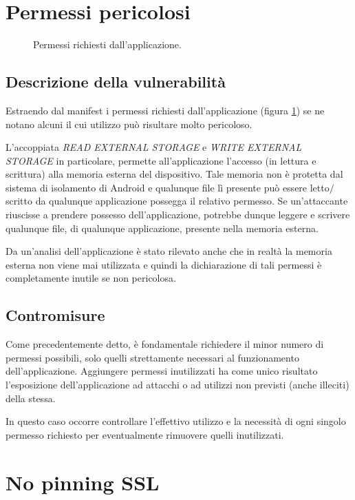 \section{Permessi pericolosi}

\begin{figure}[h]
	\centering 
	\caption{Permessi richiesti dall'applicazione.}
	\label{fig:permessi}
\end{figure}

\subsection{Descrizione della vulnerabilità}

Estraendo dal manifest i permessi richiesti dall'applicazione (figura \ref{fig:permessi}) se ne notano alcuni il cui utilizzo può risultare molto pericoloso. 

L'accoppiata \emph{READ EXTERNAL STORAGE} e \emph{WRITE EXTERNAL STORAGE} in particolare, permette all'applicazione l'accesso (in lettura e scrittura) alla memoria esterna del dispositivo. Tale memoria non è protetta dal sistema di isolamento di Android e qualunque file lì presente può essere letto$/$scritto da qualunque applicazione possegga il relativo permesso. Se un'attaccante riuscisse a prendere possesso dell'applicazione, potrebbe dunque leggere e scrivere qualunque file, di qualunque applicazione, presente nella memoria esterna.

Da un'analisi dell'applicazione è stato rilevato anche che in realtà la memoria esterna non viene mai utilizzata e quindi la dichiarazione di tali permessi è completamente inutile se non pericolosa.

\subsection{Contromisure}
Come precedentemente detto, è fondamentale richiedere il minor numero di permessi possibili, solo quelli strettamente necessari al funzionamento dell'applicazione. Aggiungere permessi inutilizzati ha come unico risultato l'esposizione dell'applicazione ad attacchi o ad utilizzi non previsti (anche illeciti) della stessa.

In questo caso occorre controllare l'effettivo utilizzo e la necessità di ogni singolo permesso richiesto per eventualmente rimuovere quelli inutilizzati.

\section{No pinning SSL}

